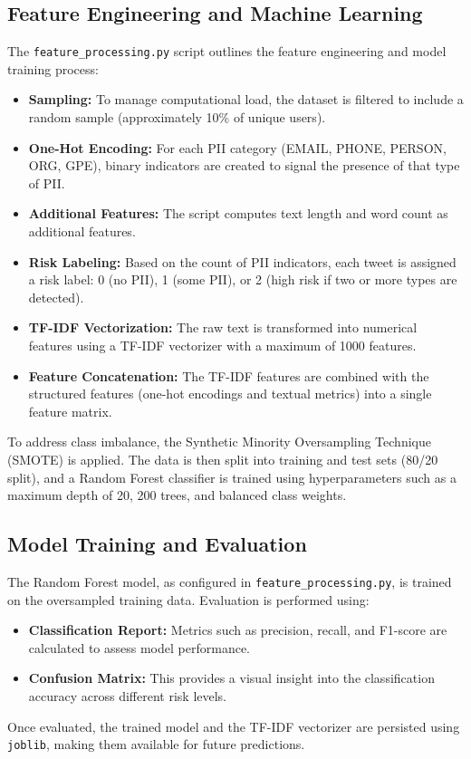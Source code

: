 \documentclass{article}
\begin{document}
\subsection{Feature Engineering and Machine Learning}
The \texttt{feature\_processing.py} script outlines the feature engineering and model training process:
\begin{itemize}
    \item \textbf{Sampling:} To manage computational load, the dataset is filtered to include a random sample (approximately 10\% of unique users).
    \item \textbf{One-Hot Encoding:} For each PII category (EMAIL, PHONE, PERSON, ORG, GPE), binary indicators are created to signal the presence of that type of PII.
    \item \textbf{Additional Features:} The script computes text length and word count as additional features.
    \item \textbf{Risk Labeling:} Based on the count of PII indicators, each tweet is assigned a risk label: 0 (no PII), 1 (some PII), or 2 (high risk if two or more types are detected).
    \item \textbf{TF-IDF Vectorization:} The raw text is transformed into numerical features using a TF-IDF vectorizer with a maximum of 1000 features.
    \item \textbf{Feature Concatenation:} The TF-IDF features are combined with the structured features (one-hot encodings and textual metrics) into a single feature matrix.
\end{itemize}
To address class imbalance, the Synthetic Minority Oversampling Technique (SMOTE) is applied. The data is then split into training and test sets (80/20 split), and a Random Forest classifier is trained using hyperparameters such as a maximum depth of 20, 200 trees, and balanced class weights.

\subsection{Model Training and Evaluation}
The Random Forest model, as configured in \texttt{feature\_processing.py}, is trained on the oversampled training data. Evaluation is performed using:
\begin{itemize}
    \item \textbf{Classification Report:} Metrics such as precision, recall, and F1-score are calculated to assess model performance.
    \item \textbf{Confusion Matrix:} This provides a visual insight into the classification accuracy across different risk levels.
\end{itemize}
Once evaluated, the trained model and the TF-IDF vectorizer are persisted using \texttt{joblib}, making them available for future predictions.
\end{document}

